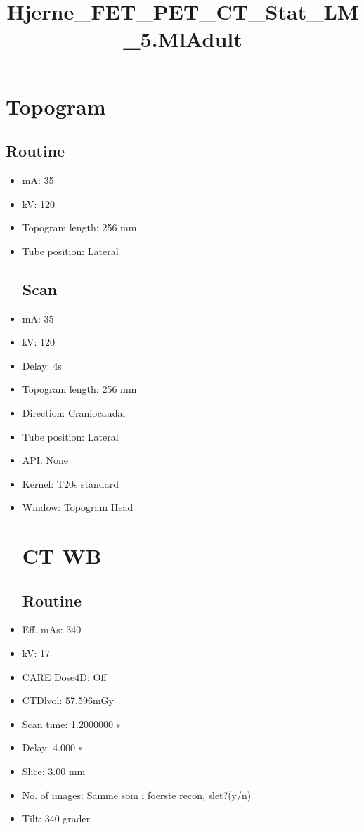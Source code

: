 \documentclass[12pt]{article}
\title{Hjerne\_FET\_PET\_CT\_Stat\_LM\_5.MlAdult}
\begin{document}
\maketitle
\newpage
\tableofcontents
\newpage
{}


\section{Topogram}
\subsection{Routine}
 \begin{itemize}\item mA: 35\item kV: 120\item Topogram length: 256 mm\item Tube position: Lateral
\subsection{Scan}
\item mA: 35\item kV: 120\item Delay: 4s\item Topogram length: 256 mm\item Direction: Craniocaudal\item Tube position: Lateral\item API: None\item Kernel: T20s standard\item Window: Topogram Head
\section{CT WB}
\subsection{Routine}
\item Eff. mAs: 340\item kV: 17\item CARE Dose4D: Off\item CTDlvol: 57.596mGy\item Scan time: 1.2000000 s\item Delay: 4.000 s\item Slice: 3.00 mm\item No. of images: Samme som i foerste recon, slet?(y/n)\item Tilt: 340 grader

\end{itemize}
\end{document}
